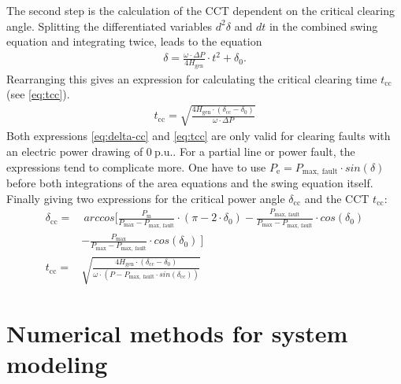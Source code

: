 The second step is the calculation of the \acs{CCT} dependent on the critical clearing angle. Splitting the differentiated variables $d^2\delta$ and $dt$ in the combined swing equation and integrating twice, leads to the equation
\begin{align}
        \delta=\frac{\omega \cdot \Delta P}{4 H_\mathrm{gen}} \cdot t^2 + \delta_\mathrm{0}. \nonumber
\end{align}
Rearranging this gives an expression for calculating the critical clearing time $t_\mathrm{cc}$ (see \autoref{eq:tcc}).
\begin{align}
        t_\mathrm{cc}=\sqrt{\frac{4 H_\mathrm{gen} \cdot (\delta_\mathrm{cc}-\delta_\mathrm{0})}{\omega \cdot \Delta P}} \label{eq:tcc}
\end{align}
Both expressions \autoref{eq:delta-cc} and \autoref{eq:tcc} are only valid for clearing faults with an electric power drawing of $0~\mathrm{p.u.}$. For a partial line or power fault, the expressions tend to complicate more. One have to use $P_\mathrm{e}=P_\mathrm{max,~fault} \cdot sin(\delta)$ before both integrations of the area equations and the swing equation itself. Finally giving two expressions for the critical power angle $\delta_\mathrm{cc}$ and the \acs{CCT} $t_\mathrm{cc}$:
\begin{align}
        \delta_\mathrm{cc}=&~arccos\Bigg[\frac{P_\mathrm{m}}{P_\mathrm{max}-P_\mathrm{max,~fault}} \cdot (\pi-2 \cdot \delta_\mathrm{0})-\frac{P_\mathrm{max,~fault}}{P_\mathrm{max}-P_\mathrm{max,~fault}} \cdot cos(\delta_\mathrm{0}) \nonumber \\& - \frac{P_\mathrm{max}}{P_\mathrm{max}-P_\mathrm{max,~fault}} \cdot cos(\delta_\mathrm{0})~\Bigg] \label{eq:delta-cc-adv} \\[12pt]
        t_\mathrm{cc}=&\sqrt{\frac{4 H_\mathrm{gen} \cdot (\delta_\mathrm{cc}-\delta_\mathrm{0})}{\omega \cdot (P-P_\mathrm{max,~fault} \cdot sin(\delta_\mathrm{cc}))}} \label{eq:tcc-adv}
\end{align}

\section{Numerical methods for system modeling}

